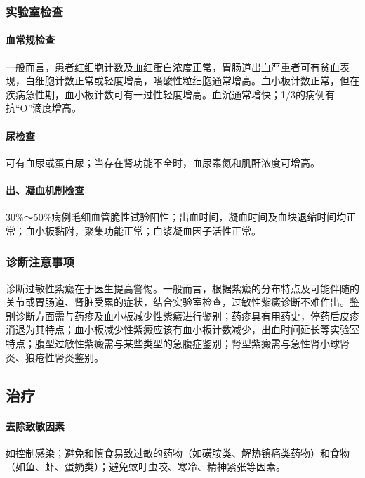 \subsubsection{实验室检查}

\paragraph{血常规检查}

一般而言，患者红细胞计数及血红蛋白浓度正常，胃肠道出血严重者可有贫血表现，白细胞计数正常或轻度增高，嗜酸性粒细胞通常增高。血小板计数正常，但在疾病急性期，血小板计数可有一过性轻度增高。血沉通常增快；1/3的病例有抗“O”滴度增高。

\paragraph{尿检查}

可有血尿或蛋白尿；当存在肾功能不全时，血尿素氮和肌酐浓度可增高。

\paragraph{出、凝血机制检查}

30\%～50\%病例毛细血管脆性试验阳性；出血时间，凝血时间及血块退缩时间均正常；血小板黏附，聚集功能正常；血浆凝血因子活性正常。

\subsubsection{诊断注意事项}

诊断过敏性紫癜在于医生提高警惕。一般而言，根据紫癜的分布特点及可能伴随的关节或胃肠道、肾脏受累的症状，结合实验室检查，过敏性紫癜诊断不难作出。鉴别诊断方面需与药疹及血小板减少性紫癜进行鉴别；药疹具有用药史，停药后皮疹消退为其特点；血小板减少性紫癜应该有血小板计数减少，出血时间延长等实验室特点；腹型过敏性紫癜需与某些类型的急腹症鉴别；肾型紫癜需与急性肾小球肾炎、狼疮性肾炎鉴别。

\subsection{治疗}

\paragraph{去除致敏因素}

如控制感染；避免和慎食易致过敏的药物（如磺胺类、解热镇痛类药物）和食物（如鱼、虾、蛋奶类）；避免蚊叮虫咬、寒冷、精神紧张等因素。

